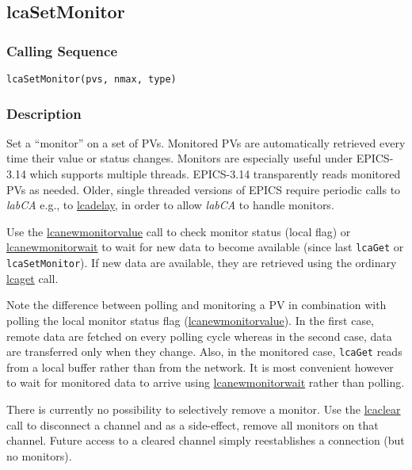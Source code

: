 \documentclass{article}
\newcommand{\sca}{\ita{labCA}}
\newcommand{\com}[1]{{\tt #1}}
\newcommand{\pbrk}{\pagebreak[3]}
\newcommand{\comref}[2]{\hyperref{\com{#1}}{\com{#1} (see }{)}{#2}}
\newcommand{\ita}[1]{\emph{#1}}
\renewcommand{\pbrk}{}
\begin{document}
\pbrk
\subsection{lcaSetMonitor}
\label{lcasetmonitor}
\subsubsection{Calling Sequence}
\begin{verbatim}
lcaSetMonitor(pvs, nmax, type)
\end{verbatim}
\subsubsection{Description}
Set a ``monitor'' on a set of PVs. Monitored PVs are automatically retrieved
every time their value or status changes. 
Monitors are especially useful under EPICS-3.14 which supports
multiple threads. EPICS-3.14 transparently reads monitored PVs as needed.
Older, single threaded versions of EPICS require periodic calls to \sca{}
e.g., to \comref{lcaDelay}{lcadelay}, in order to allow \sca{} to handle
monitors.

Use the \comref{lcaNewMonitorValue}{lcanewmonitorvalue} call to check
monitor status (local flag) or \comref{lcaNewMonitorWait}{lcanewmonitorwait}
to wait for new data to become available (since last \com{lcaGet} or \com{lcaSetMonitor}).
If new data are available, they are retrieved using
the ordinary \comref{lcaGet}{lcaget} call.

Note the difference between polling and monitoring a PV in combination with
polling the local monitor status flag (\comref{lcaNewMonitorValue}{lcanewmonitorvalue}).
In the first case, remote data are fetched
on every polling cycle whereas in the second case, data are transferred only
when they change.  Also, in the monitored case, \com{lcaGet} reads from a local
buffer rather than from the network. It is most convenient however to wait
for monitored data to arrive using \comref{lcaNewMonitorWait}{lcanewmonitorwait}
rather than polling.

There is currently no possibility to selectively remove a monitor. Use
the \comref{lcaClear}{lcaclear} call to disconnect a channel and as a side-effect,
remove all monitors on that channel. Future access to a cleared channel
simply reestablishes a connection (but no monitors).
\end{document}

